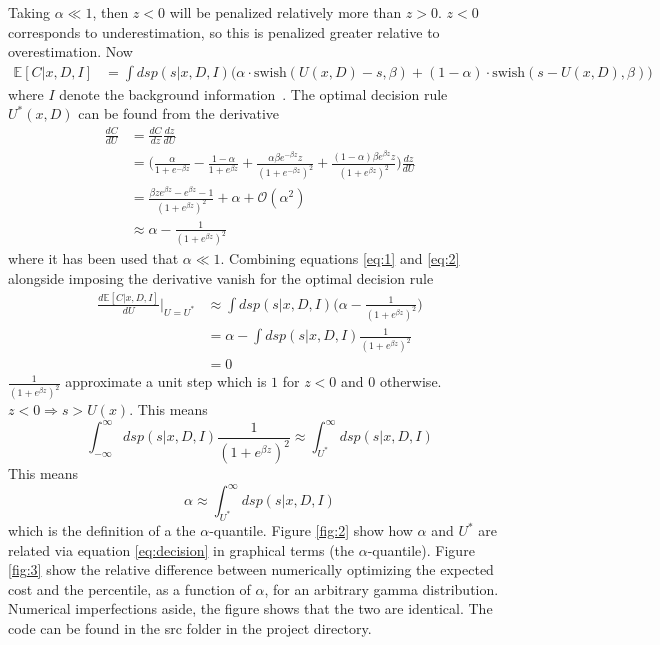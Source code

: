 \documentclass[a4paper,11pt, oneside]{article}
\theoremstyle{definition}
\begin{document}
	Taking $\alpha \ll 1$, then $z<0$ will be penalized relatively more than $z>0$. $z<0$ corresponds to underestimation, so this is penalized greater relative to overestimation. Now
	\begin{equation}
		\begin{split}
			\mathbb{E}[C|x,D,I] & =\int ds p(s|x,D,I) \bigg(\alpha\cdot \text{swish}(U(x,D)-s,\beta)+(1-\alpha)\cdot\text{swish}(s-U(x,D),\beta)\bigg)
		\end{split}
		\label{eq:1}
	\end{equation}
	where $I$ denote the background information~\citep{Sivia2006}. The optimal decision rule $U^*(x,D)$ can be found from the derivative
	\begin{equation}
		\begin{split}
			\frac{dC}{dU} & = \frac{dC}{dz}\frac{dz}{dU}\\
			& = \bigg(\frac{\alpha}{1+e^{-\beta z}}-\frac{1-\alpha}{1+e^{\beta z}}+\frac{\alpha\beta e^{-\beta z}z}{(1+e^{-\beta z})^2}+\frac{(1-\alpha)\beta e^{\beta z}z}{(1+e^{\beta z})^2}\bigg)\frac{dz}{dU}\\
			&= \frac{\beta z e^{\beta z}-e^{\beta z}-1}{(1+e^{\beta z})^2}+\alpha+\mathcal{O}(\alpha^2)\\
			&\approx  \alpha -\frac{1}{(1+e^{\beta z})^2}
		\end{split}
		\label{eq:2}
	\end{equation}
	where it has been used that $\alpha\ll 1$. Combining equations \eqref{eq:1} and \eqref{eq:2} alongside imposing the derivative vanish for the optimal decision rule
	\begin{equation}
		\begin{split}
			\frac{d\mathbb{E}[C|x,D,I ]}{dU}\bigg|_{U=U^*} &\approx \int ds p(s|x,D,I) \bigg(\alpha -\frac{1}{(1+e^{\beta z})^2}\bigg)\\
			& = \alpha -\int ds p(s|x,D,I)\frac{1}{(1+e^{\beta z})^2}\\
			& = 0
		\end{split}
	\end{equation}
	$\frac{1}{(1+e^{\beta z})^2}$ approximate a unit step which is $1$ for $z<0$ and $0$ otherwise. $z<0 \Rightarrow s>U(x)$. This means
	\begin{equation}
		\int_{-\infty}^{\infty} ds p(s|x,D,I)\frac{1}{(1+e^{\beta z})^2} \approx \int_{U^*}^{\infty} ds p(s|x,D,I)
	\end{equation}
	This means
	\begin{equation}
		\alpha \approx \int_{U^*}^{\infty} ds p(s|x,D,I)
		\label{eq:decision}
	\end{equation}
	which is the definition of a the $\alpha$-quantile. Figure \ref{fig:2} show how $\alpha$ and $U^*$ are related via equation \eqref{eq:decision} in graphical terms (the $\alpha$-quantile). Figure \ref{fig:3} show the relative difference between numerically optimizing the expected cost and the percentile, as a function of $\alpha$, for an arbitrary gamma distribution. Numerical imperfections aside, the figure shows that the two are identical. The code can be found in the src folder in the project directory.
	
\end{document}
